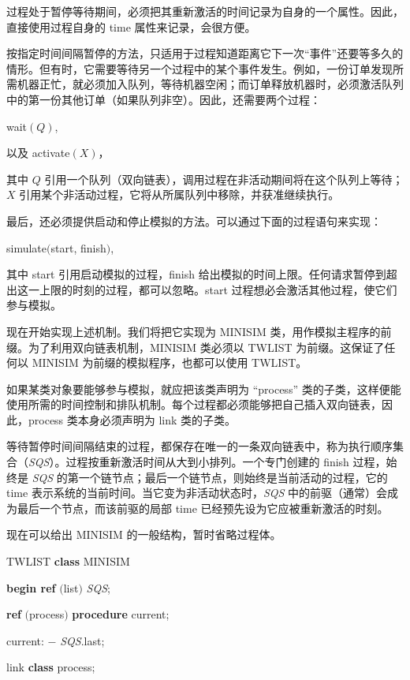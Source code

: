 \documentclass[twoside,11pt,fontset=none]{ctexbook}
\begin{document}
过程处于暂停等待期间，必须把其重新激活的时间记录为自身的一个属性。因此，直接使用过程自身的 time 属性来记录，会很方便。

按指定时间间隔暂停的方法，只适用于过程知道距离它下一次“事件”还要等多久的情形。但有时，它需要等待另一个过程中的某个事件发生。例如，一份订单发现所需机器正忙，就必须加入队列，等待机器空闲；而订单释放机器时，必须激活队列中的第一份其他订单（如果队列非空）。因此，还需要两个过程：

\quad wait$(Q)$,

\quad 以及 activate$(X)$，

\noindent
其中 $Q$ 引用一个队列（双向链表），调用过程在非活动期间将在这个队列上等待；$X$ 引用某个非活动过程，它将从所属队列中移除，并获准继续执行。

最后，还必须提供启动和停止模拟的方法。可以通过下面的过程语句来实现：

\quad simulate$($start, finish$)$,

\noindent
其中 start 引用启动模拟的过程，finish 给出模拟的时间上限。任何请求暂停到超出这一上限的时刻的过程，都可以忽略。start 过程想必会激活其他过程，使它们参与模拟。

现在开始实现上述机制。我们将把它实现为 MINISIM 类，用作模拟主程序的前缀。为了利用双向链表机制，MINISIM 类必须以 TWLIST 为前缀。这保证了任何以 MINISIM 为前缀的模拟程序，也都可以使用 TWLIST。

如果某类对象要能够参与模拟，就应把该类声明为 ``process'' 类的子类，这样便能使用所需的时间控制和排队机制。每个过程都必须能够把自己插入双向链表，因此，process 类本身必须声明为 link 类的子类。

等待暂停时间间隔结束的过程，都保存在唯一的一条双向链表中，称为执行顺序集合（\textit{SQS}）。过程按重新激活时间从大到小排列。一个专门创建的 finish 过程，始终是 \textit{SQS} 的第一个链节点；最后一个链节点，则始终是当前活动的过程，它的 time 表示系统的当前时间。当它变为非活动状态时，\textit{SQS} 中的前驱（通常）会成为最后一个节点，而该前驱的局部 time 已经预先设为它应被重新激活的时刻。

现在可以给出 MINISIM 的一般结构，暂时省略过程体。

\quad TWLIST \textbf{class} MINISIM

\quad \textbf{begin ref} $($list$)$ \textit{SQS};

\quad \quad \textbf{ref} $($process$)$ \textbf{procedure} current;

\quad \quad \quad current: $-$ \textit{SQS}.last;

\quad \quad \quad link \textbf{class} process;
\end{document}
